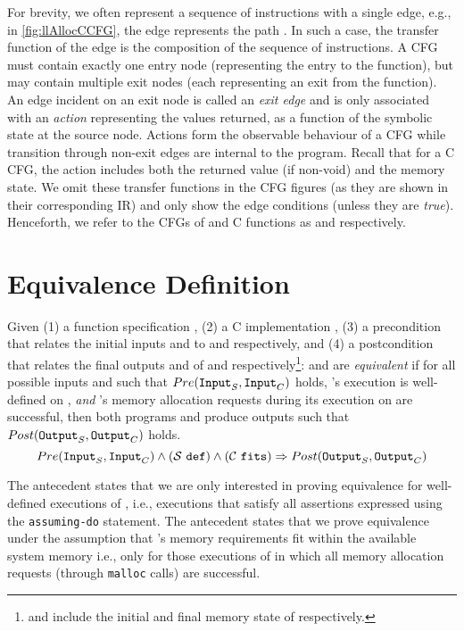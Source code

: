For brevity, we often represent a sequence of instructions with a single edge, e.g.,
in \cref{fig:llAllocCCFG}, the edge  represents the path .
In such a case, the transfer function of the edge is the composition of the sequence of instructions.
A CFG must contain exactly one entry node (representing the entry to the function), but may contain
multiple exit nodes (each representing an exit from the function).
An edge incident on an exit node is called an {\em exit edge} and is only associated with an {\em action} representing
the values returned, as a function of the symbolic state at the source node.
Actions form the observable behaviour of a CFG while transition through non-exit edges are internal to the program.
Recall that for a C CFG, the action includes both the returned value (if non-void) and the memory state.
We omit these transfer functions in the CFG figures (as they are shown in their corresponding IR)
and only show the edge conditions (unless they are {\em true}).
Henceforth, we refer to the CFGs of \SpecL{} and C functions as \sprog{} and \cprog{} respectively.

\section{Equivalence Definition}
\label{sec:eqdef}
Given (1) a \SpecL{} function specification \sprog{}, (2) a C implementation \cprog{},
(3) a precondition \pre{} that relates the initial inputs  and  to
\sprog{} and \cprog{} respectively, and (4) a postcondition \post{} that relates the final outputs
 and  of \sprog{} and \cprog{} respectively\footnote{ and 
include the initial and final memory state of \cprog{} respectively.}:
\sprog{} and \cprog{} are {\em equivalent} if for all possible inputs  and  such that
${Pre}{}({\tt Input}_{S},{\tt Input}_{C})$ holds,
\sprog{}'s execution is well-defined on , {\em and}
\cprog{}'s memory allocation requests during its execution on  are successful,
then both programs \sprog{} and \cprog{} produce outputs such that ${Post}{}({\tt Output}_{S},{\tt Output}_{C})$ holds.
$$
{Pre}{}({\tt Input}_{S},{\tt Input}_{C}) \land {({\ensuremath{\mathcal{S}}}{}\ {\tt def})}{} \land {({\ensuremath{\mathcal{C}}}{}\ {\tt fits})}{} \Rightarrow {\ensuremath{Post}}{}({\tt Output}_{S},{\tt Output}_{C})
$$

The \sdef{} antecedent states that we are only interested in proving equivalence for
well-defined executions of \sprog{}, i.e., executions that satisfy all assertions expressed
using the {\tt assuming-do} statement.
The \cfits{} antecedent states that we prove equivalence under the assumption that \cprog{}'s memory
requirements fit within the available system memory i.e., only for those executions of \cprog{}
in which all memory allocation requests (through {\tt malloc} calls) are successful.

